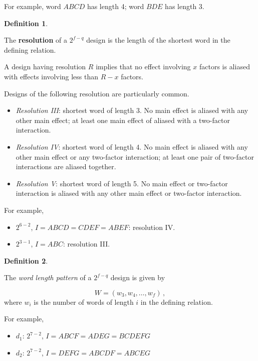 \documentclass[
]{book}
\theoremstyle{definition}
\newtheorem{definition}{Definition}[chapter]
\theoremstyle{definition}
\theoremstyle{definition}
\theoremstyle{definition}
\theoremstyle{remark}
\begin{document}
For example, word \(ABCD\) has length 4; word \(BDE\) has length 3.

\begin{definition}
\protect\hypertarget{def:resolution}{}\label{def:resolution}

The \textbf{resolution} of a \(2^{f-q}\) design is the length of the shortest word in the defining relation.

A design having resolution \(R\) implies that no effect involving \(x\) factors is aliased with effects involving less than \(R-x\) factors.

Designs of the following resolution are particularly common.

\begin{itemize}
\item
  \emph{Resolution III}: shortest word of length 3. No main effect is aliased with any other main effect; at least one main effect of aliased with a two-factor interaction.
\item
  \emph{Resolution IV}: shortest word of length 4. No main effect is aliased with any other main effect or any two-factor interaction; at least one pair of two-factor interactions are aliased together.
\item
  \emph{Resolution V}: shortest word of length 5. No main effect or two-factor interaction is aliased with any other main effect or two-factor interaction.
\end{itemize}

\end{definition}

For example,

\begin{itemize}
\item
  \(2^{6-2}\), \(I = ABCD = CDEF = ABEF\): resolution IV.
\item
  \(2^{3-1}\), \(I = ABC\): resolution III.
\end{itemize}

\begin{definition}
\protect\hypertarget{def:wlp}{}\label{def:wlp}

The \emph{word length pattern} of a \(2^{f-q}\) design is given by

\[
W = (w_3, w_4, \ldots, w_f)\,,
\]
where \(w_i\) is the number of words of length \(i\) in the defining relation.

\end{definition}

For example,

\begin{itemize}
\item
  \(d_1\): \(2^{7-2}\), \(I = ABCF = ADEG = BCDEFG\)
\item
  \(d_2\): \(2^{7-2}\), \(I = DEFG = ABCDF = ABCEG\)
\end{itemize}
\end{document}
